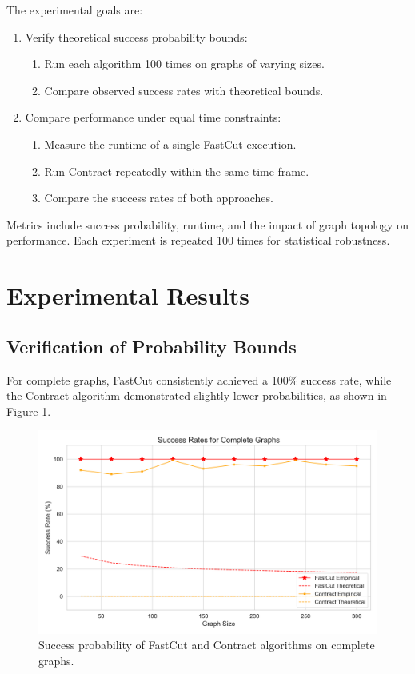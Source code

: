 \documentclass{article}
\theoremstyle{plain} %
\begin{document}
The experimental goals are:
\begin{enumerate}
    \item Verify theoretical success probability bounds:
    \begin{enumerate}
        \item Run each algorithm 100 times on graphs of varying sizes.
        \item Compare observed success rates with theoretical bounds.
    \end{enumerate}
    \item Compare performance under equal time constraints:
    \begin{enumerate}
        \item Measure the runtime of a single FastCut execution.
        \item Run Contract repeatedly within the same time frame.
        \item Compare the success rates of both approaches.
    \end{enumerate}
\end{enumerate}

Metrics include success probability, runtime, and the impact of graph topology on performance. Each experiment is repeated 100 times for statistical robustness.


\section{Experimental Results}

\subsection{Verification of Probability Bounds}

For complete graphs, FastCut consistently achieved a 100\% success rate, while the Contract algorithm demonstrated slightly lower probabilities, as shown in Figure \ref{fig:complete-success-bounds}.

\begin{figure}[H]
    \centering
    \includegraphics[width=0.8\linewidth]{assets2//graphics/success_bounds_300_complete_success_plot.png}
    \caption{Success probability of FastCut and Contract algorithms on complete graphs.}
    \label{fig:complete-success-bounds}
\end{figure}
\end{document}
